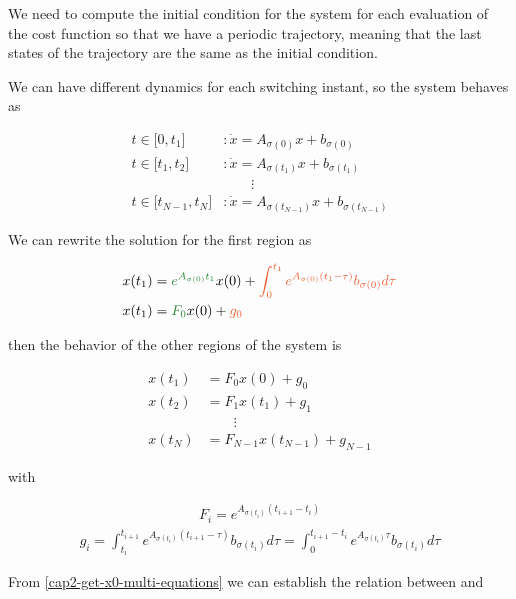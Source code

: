 We need to compute the initial condition for the system for each evaluation of the cost function so that we have a periodic trajectory, 
meaning that the last states of the trajectory are the same as the initial condition.

We can have different dynamics for each switching instant, so the system behaves as 

\begin{align}
    t \in \big[0, t_1\big]   &: \dot{x}= A_{\sigma(0)} x + b_{\sigma(0)}  \nonumber \\
    t \in \big[t_1, t_2\big] &: \dot{x}= A_{\sigma(t_1)} x + b_{\sigma(t_1)} \nonumber \\
    &\qquad \vdots \nonumber \\
    t \in \big[t_{N-1}, t_N\big] &: \dot{x}= A_{\sigma(t_{N-1})} x + b_{\sigma(t_{N-1})}
\end{align}

We can rewrite the solution for the first region as

\noindent
\begin{align}
    x(t_1) &= \green{e^{A_{\sigma(0)} t_1}} x(0) + 
            \orange{\int_{0}^{t_1}{e^{A_{\sigma(0)}(t_1 - \tau)} b_{\sigma(0)} d\tau}} \nonumber \\
    x(t_1) &= \green{F_0} x(0) + \orange{g_0}
\end{align}

\noindent
then the behavior of the other regions of the system is

\noindent
\begin{align}
    x(t_1) &= F_0 x(0) + g_0 \nonumber \\
    x(t_2) &= F_1 x(t_1) + g_1 \nonumber \\
    &\qquad \vdots \nonumber \\ 
    x(t_N) &= F_{N-1} x(t_{N-1}) + g_{N-1}
    \label{cap2-get-x0-multi-equations}
\end{align}

\noindent
with

\noindent
\begin{align}
    F_i = e^{A_{\sigma(t_i)}(t_{i+1} - t_i)} 
\end{align}
\begin{align}
    g_i = \int_{t_i}^{t_{i+1}}{e^{A_{\sigma(t_i)}(t_{i+1} - \tau)} b_{\sigma(t_i)} d\tau} = 
    \int_{0}^{t_{i+1} - t_i}{e^{A_{\sigma(t_i)}\tau} b_{\sigma(t_i)} d\tau}
\end{align}

From \eqref{cap2-get-x0-multi-equations} we can establish the relation between  and 


